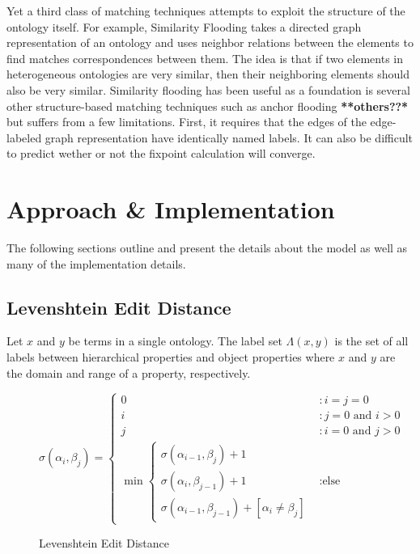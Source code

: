\documentclass[letterpaper,twocolumn,12pt]{article}
\begin{document}
Yet a third class of matching techniques attempts to exploit the structure of the ontology
itself. For example, Similarity Flooding takes a directed graph representation of an 
ontology and uses neighbor relations between the elements to find matches correspondences
between them. The idea is that if two elements in heterogeneous ontologies are very similar,
then their neighboring elements should also be very similar.
%
Similarity flooding has been useful as a foundation is several other structure-based
matching techniques such as anchor flooding \textbf{**others??*} but suffers from 
a few limitations. First, it requires that the edges of the edge-labeled graph 
representation have identically named labels. It can also be difficult to predict
wether or not the fixpoint calculation will converge.
\newline

\section{Approach \& Implementation}

The following sections outline and present the details about the model as well as many of the implementation details.

\subsection{Levenshtein Edit Distance}

\begin{defn}
Let $x$ and $y$ be terms in a single ontology. The label set $\Lambda \left( x, y \right)$ is the set of all labels between hierarchical properties and object properties where $x$ and $y$ are the domain and range of a property, respectively.
\end{defn}

\begin{figure*}
\centering
\begin{equation*}
\sigma 
\left( \alpha_i, \beta_j \right) = \left\{
	\begin{array}{ll}
   	 	0 &: i=j=0 \\
		i &: j = 0 \text{ and } i > 0 \\
		j &: i = 0 \text{ and } j > 0 \\
		\min 
			\left\{ 
			\begin{array}{l}
				\sigma \left( \alpha_{i-1}, \beta_j \right) + 1 \\
          		\sigma \left( \alpha_i, \beta_{j-1} \right) + 1 \\
          		\sigma \left( \alpha_{i-1}, \beta_{j-1} \right) + [\alpha_i \neq \beta_j]
			\end{array} \right. &: \text{else}
     \end{array}
\right.
\end{equation*}
\caption{Levenshtein Edit Distance}
\end{figure*}
\end{document}
